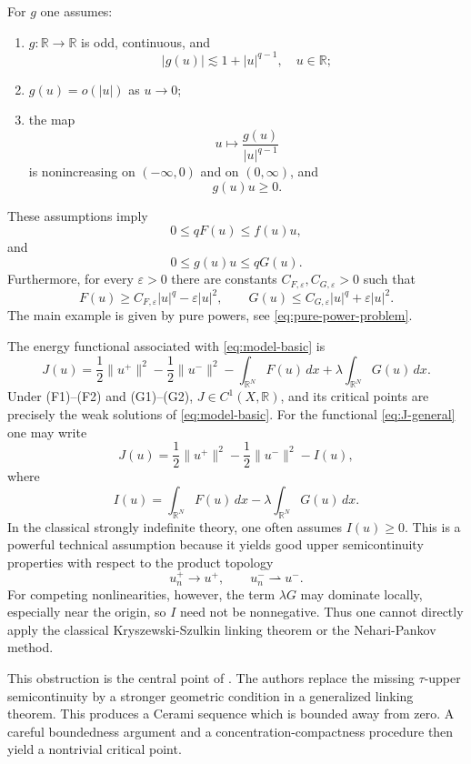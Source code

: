 \documentclass[10pt,a4paper]{amsart}
\numberwithin{equation}{section}
\newcommand{\R}{\mathbb{R}}
\newcommand{\eps}{\varepsilon}
\newcommand{\weak}{\rightharpoonup}
\begin{document}
For $g$ one assumes:
\begin{enumerate}[label=(G\arabic*)]
\item $g:\R\to\R$ is odd, continuous, and 
\[
|g(u)|\lesssim 1+|u|^{q-1}, \quad u \in \R;
\]
\item $g(u)=o(|u|)$ as $u\to0$;
\item the map
\[
u\mapsto \frac{g(u)}{|u|^{q-1}}
\]
is nonincreasing on $(-\infty,0)$ and on $(0,\infty)$, and
\[
g(u)u\ge0.
\]
\end{enumerate}
These assumptions imply
\begin{equation}
0\le qF(u)\le f(u)u,
\end{equation}
and
\begin{equation}
0\le g(u)u\le qG(u).
\end{equation}
Furthermore, for every $\eps>0$ there are constants
$C_{F,\eps},C_{G,\eps}>0$ such that
\begin{equation}
F(u)\ge C_{F,\eps}|u|^q-\eps |u|^2,
\qquad
G(u)\le C_{G,\eps}|u|^q+\eps |u|^2.
\end{equation}
The main example is given by pure powers, see \eqref{eq:pure-power-problem}.

The energy functional associated with \eqref{eq:model-basic} is
\begin{equation}\label{eq:J-general}
J(u)=\frac12\|u^+\|^2-\frac12\|u^-\|^2
-\int_{\R^N}F(u)\,dx+\lambda\int_{\R^N}G(u)\,dx.
\end{equation}
Under (F1)--(F2) and (G1)--(G2), $J\in C^1(X,\R)$, and its critical
points are precisely the weak solutions of \eqref{eq:model-basic}.
For the functional \eqref{eq:J-general} one may write
\[
J(u)=\frac12\|u^+\|^2-\frac12\|u^-\|^2-I(u),
\]
where
\[
I(u)=\int_{\R^N}F(u)\,dx-\lambda\int_{\R^N}G(u)\,dx.
\]
In the classical strongly indefinite theory, one often assumes
$I(u)\ge0$. This is a powerful technical assumption because it yields
good upper semicontinuity properties with respect to the product topology
\[
u_n^+\to u^+,\qquad u_n^-\weak u^-.
\]
For competing nonlinearities, however, the term $\lambda G$ may dominate
locally, especially near the origin, so $I$ need not be nonnegative. Thus
one cannot directly apply the classical Kryszewski-Szulkin linking theorem
or the Nehari-Pankov method.

This obstruction is the central point of \cite{BB2022}. The authors
replace the missing $\tau$-upper semicontinuity by a stronger geometric
condition in a generalized linking theorem. This produces a Cerami
sequence which is bounded away from zero. A careful boundedness argument
and a concentration-compactness procedure then yield a nontrivial critical
point.
\end{document}
